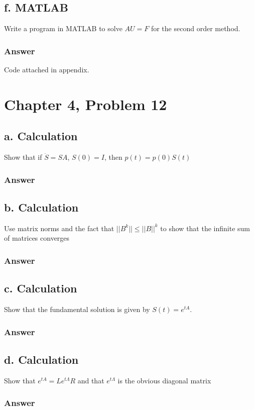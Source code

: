 \documentclass{article}
\begin{document}
	\subsection{f. MATLAB}
		Write a program in MATLAB to solve $AU=F$ for the second order method.
		\subsubsection{Answer}
		Code attached in appendix.
		
	\section{Chapter 4, Problem 12}
		\subsection{a. Calculation}
		Show that if $\dot{S}=SA$, $S(0)=I$, then $p(t)=p(0)S(t)$
		\subsubsection{Answer}
		
		\subsection{b. Calculation}
		Use matrix norms and the fact that $||B^{k}||\leq||B||^{k}$ to show that the infinite sum of matrices converges
		\subsubsection{Answer}
		
		\subsection{c. Calculation}
		Show that the fundamental solution is given by $S(t)=e^{tA}$.
		\subsubsection{Answer}
		
		\subsection{d. Calculation}
		Show that $e^{tA}=Le^{t\Lambda}R$ and that $e^{t\Lambda}$ is the obvious diagonal matrix
		\subsubsection{Answer}
		
\end{document}
